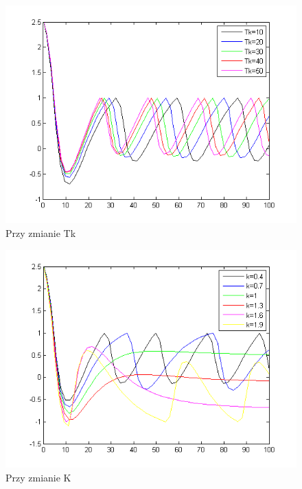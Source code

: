 \documentclass[a4paper,10pt]{article}
\begin{document}
\begin{enumerate}
\begin{figure}[!h]
    \centering
	\includegraphics[width=120mm]{CW3-korekcja-trojpolozeniowy-e_Tk.png}
	\caption{Przy zmianie Tk}
    \label{fig:Rysunek}
\end{figure}

\begin{figure}[!h]
    \centering
	\includegraphics[width=120mm]{CW3-korekcja-trojpolozeniowy-e_k.png}
	\caption{Przy zmianie K}
    \label{fig:Rysunek}
\end{figure}


\end{enumerate}
\end{document}
